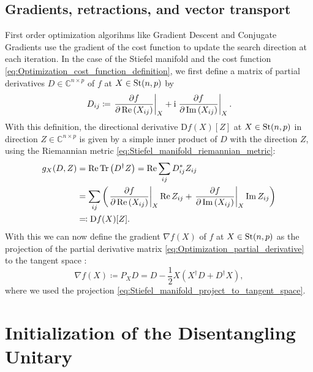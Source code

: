 \documentclass[encoding=utf8,british]{template/thesis}
\begin{document}
	\section{Gradients, retractions, and vector transport}
	
	First order optimization algorihms like Gradient Descent and Conjugate Gradients use the gradient of the cost function to update the search direction at each iteration. In the case of the Stiefel manifold and the cost function \eqref{eq:Optimization_cost_function_definition}, we first define a matrix of partial derivatives $D \in \mathbb{C}^{n\times p}$ of $f$ at $X\in\text{St}(n,p)$ by
	\begin{equation}
		\label{eq:Optimization_partial_derivative}
	 	D_{ij} \coloneqq \left.\frac{\partial f}{\partial \operatorname{Re}\left(X_{ij}\right)}\right|_{X} + \mathrm{i} \left.\frac{\partial f}{\partial \operatorname{Im}\left(X_{ij}\right)}\right|_{X}.
	\end{equation}
	With this definition, the directional derivative $\text{D}f(X)[Z]$ at $X\in\text{St}(n,p)$ in direction $Z\in\mathbb{C}^{n\times p}$ is given by a simple inner product of $D$ with the direction $Z$, using the Riemannian metric \eqref{eq:Stiefel_manifold_riemannian_metric}:
	\begin{equation}
		\label{eq:riemannian_optimization_directional_derivative_partial_derivatives}
		\begin{split}
			g_X(D, Z) &= \operatorname{Re}\operatorname{Tr}\left(D^\dagger Z\right) = \operatorname{Re}\sum_{ij} D_{ij}^*Z_{ij} \\
			&= \sum_{ij} \left(\left.\frac{\partial f}{\partial \operatorname{Re}\left(X_{ij}\right)}\right|_{X}\operatorname{Re} Z_{ij} + \left.\frac{\partial f}{\partial \operatorname{Im}\left(X_{ij}\right)}\right|_{X} \operatorname{Im} Z_{ij}\right) \\
			&\eqqcolon \text{D}f(X)[Z].
		\end{split}
	\end{equation}
	With this we can now define the gradient $\nabla f(X)$ of $f$ at $X\in\text{St}(n,p)$ as the projection of the partial derivative matrix \eqref{eq:Optimization_partial_derivative} to the tangent space \cite{cite:optimization_on_matrix_manifolds, cite:riemannian_optimization_isometric_tensor_networks}:
	\begin{equation}
		\label{eq:riemannian_optimization_gradient_of_cost_function}
		\nabla f(X) \coloneqq P_X D = D - \frac{1}{2}X\left(X^\dagger D + D^\dagger X\right),
	\end{equation}
	where we used the projection \eqref{eq:Stiefel_manifold_project_to_tangent_space}.
	
	
	\chapter{Initialization of the Disentangling Unitary}
	
	\backmatter
	\printbibliography
	
\end{document}
